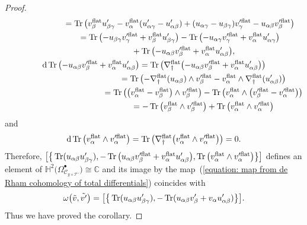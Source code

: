 \documentclass[pdftex]{sigma}
\numberwithin{equation}{section}
\newcommand{\Tr}{\mathop{\rm Tr}\nolimits}
\begin{document}
\begin{proof}
\begin{gather*}
 \hphantom{{\rm d} \Tr\big(u_{\alpha\beta}u'_{\beta\gamma}\big)}{}=
 \Tr \big( v_{\beta}^{\rm flat}u'_{\beta\gamma}
 -v_{\alpha}^{\rm flat} (u'_{\alpha\gamma}-u'_{\alpha\beta})
 + (u_{\alpha\gamma}-u_{\beta\gamma}) v'^{\rm flat}_{\gamma}
 - u_{\alpha\beta} v'^{\rm flat}_{\beta} \big)
 \\
 \hphantom{{\rm d} \Tr\big(u_{\alpha\beta}u'_{\beta\gamma}\big)}{}=
 \Tr \big( {-}u_{\beta\gamma} v'^{\rm flat}_{\gamma}
 +v^{\rm flat}_{\beta} u'_{\beta\gamma} \big)
 -
 \Tr \big( {-}u_{\alpha\gamma} v'^{\rm flat}_{\gamma}
 +v^{\rm flat}_{\alpha} u'_{\alpha\gamma} \big)\\
\hphantom{{\rm d} \Tr\big(u_{\alpha\beta}u'_{\beta\gamma}\big)=}{}
 +\Tr \big( {-}u_{\alpha\beta} v'^{\rm flat}_{\beta}
 +v^{\rm flat}_{\alpha} u'_{\alpha\beta} \big),
\\
 {\rm d}\Tr \big( {-}u_{\alpha\beta} v'^{\rm flat}_{\beta} +v^{\rm flat}_{\alpha} u'_{\alpha\beta} \big) =
 \Tr \big( \nabla^{\rm flat}_{\dag} \big({-}u_{\alpha\beta}v'^{\rm flat}_{\beta}+v^{\rm flat}_{\alpha}u'_{\alpha\beta}\big)\big)
 \\
\hphantom{{\rm d}\Tr \big( {-}u_{\alpha\beta} v'^{\rm flat}_{\beta} +v^{\rm flat}_{\alpha} u'_{\alpha\beta} \big)}{}
 =
 \Tr \big( {-}\nabla^{\rm flat}_{\dag}(u_{\alpha\beta})\wedge v'^{\rm flat}_{\beta}
 -v^{\rm flat}_{\alpha} \wedge \nabla^{\rm flat}_{\dag}(u'_{\alpha\beta}) \big)
 \\
 \hphantom{{\rm d}\Tr \big( {-}u_{\alpha\beta} v'^{\rm flat}_{\beta} +v^{\rm flat}_{\alpha} u'_{\alpha\beta} \big)}{}=
\Tr \big( \big( v^{\rm flat}_{\alpha} - v^{\rm flat}_{\beta} \big) \wedge v'^{\rm flat}_{\beta} \big)
-\Tr \big( v^{\rm flat}_{\alpha} \wedge \big( v'^{\rm flat}_{\beta}-v'^{\rm flat}_{\alpha} \big) \big)
\\
\hphantom{{\rm d}\Tr \big( {-}u_{\alpha\beta} v'^{\rm flat}_{\beta} +v^{\rm flat}_{\alpha} u'_{\alpha\beta} \big)}{} =
-\Tr \big( v^{\rm flat}_{\beta} \wedge v'^{\rm flat}_{\beta} \big)
+\Tr \big( v^{\rm flat}_{\alpha} \wedge v'^{\rm flat}_{\alpha} \big)
\end{gather*}
and
\begin{gather*}
 {\rm d}\Tr\big(v_{\alpha}^{\rm flat}\wedge v'^{\rm flat}_{\alpha}\big)
 =
 \Tr \big( \nabla^{\rm flat}_{\dag}\big(v^{\rm flat}_{\alpha}\wedge v'^{\rm flat}_{\alpha}\big)\big)
 =0.
\end{gather*}
Therefore,
$\big[ \big\{ \Tr(u_{\alpha\beta}u'_{\beta\gamma}) ,
-\Tr\big(u_{\alpha\beta}v'^{\rm flat}_{\beta}+v^{\rm flat}_{\alpha}u'_{\alpha\beta}\big) ,
\Tr\big(v^{\rm flat}_{\alpha}\wedge v'^{\rm flat}_{\alpha}\big) \big\} \big]$
defines an element of
$\mathbb{H}^2\big(\Omega^{\bullet}_{{\mathcal C}_{y\times{\mathcal T}'}}\big)\cong\mathbb{C}$
and its image by the map~(\ref{equation: map from de Rham cohomology of total differentials})
coincides with
\[
\omega\big(\tilde{v},\tilde{v'} \big)
=\big[ \big\{ \Tr(u_{\alpha\beta}u'_{\beta\gamma}) ,
-\Tr(u_{\alpha\beta}v'_{\beta}+v_{\alpha}u'_{\alpha\beta}) \big\} \big].
\]
Thus we have proved the corollary.
\end{proof}
\end{document}
